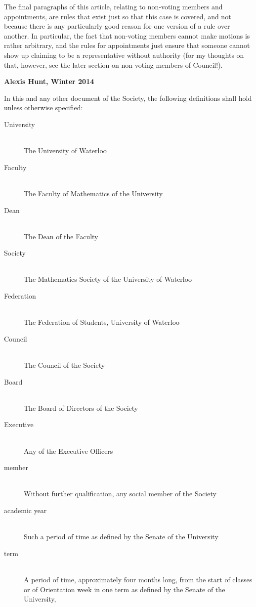 \begin{annotation}
The final paragraphs of this article, relating to non-voting members and
appointments, are rules that exist just so that this case is covered, and not
because there is any particularly good reason for one version of a rule over
another. In particular, the fact that non-voting members cannot make motions is
rather arbitrary, and the rules for appointments just ensure that someone cannot
show up claiming to be a representative without authority (for my thoughts on
that, however, see the later section on non-voting members of Council!).

\textbf{Alexis Hunt, Winter 2014}
\end{annotation}

In this and any other document of the Society, the following definitions shall
hold unless otherwise specified:
\begin{description}
\item[University]\hfill\\
  The University of Waterloo
\item[Faculty]\hfill\\
  The Faculty of Mathematics of the University
\item[Dean]\hfill\\
  The Dean of the Faculty
\item[Society]\hfill\\
    The Mathematics Society of the University of Waterloo
\item[Federation]\hfill\\
  The Federation of Students, University of Waterloo
\item[Council]\hfill\\
    The Council of the Society
\item[Board]\hfill\\
    The Board of Directors of the Society
\item[Executive]\hfill\\
    Any of the Executive Officers
\item[member]\hfill\\
  Without further qualification, any social member of the Society
\item[academic year]\hfill\\
  Such a period of time as defined by the Senate of the University
\item[term]\hfill\\
  A period of time, approximately four months long, from the start of classes or
  of Orientation week in one term as defined by the Senate of the University,

\end{description}
